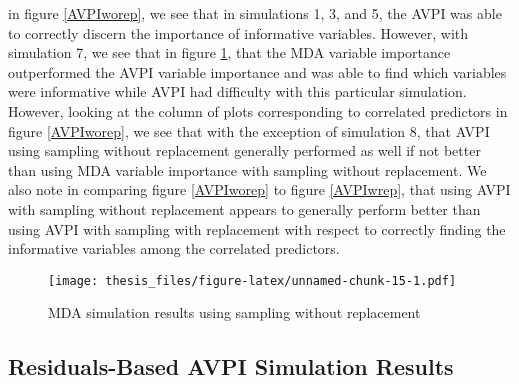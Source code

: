 \documentclass[12pt,twoside]{reedthesis}
\theoremstyle{definition}
\theoremstyle{definition}
\theoremstyle{definition}
\theoremstyle{remark}
\begin{document}
in figure \ref{AVPIworep}, we see that in simulations 1, 3, and 5, the
AVPI was able to correctly discern the importance of informative
variables. However, with simulation 7, we see that in figure
\ref{MDAworep1}, that the MDA variable importance outperformed the AVPI
variable importance and was able to find which variables were
informative while AVPI had difficulty with this particular simulation.
However, looking at the column of plots corresponding to correlated
predictors in figure \ref{AVPIworep}, we see that with the exception of
simulation 8, that AVPI using sampling without replacement generally
performed as well if not better than using MDA variable importance with
sampling without replacement. We also note in comparing figure
\ref{AVPIworep} to figure \ref{AVPIwrep}, that using AVPI with sampling
without replacement appears to generally perform better than using AVPI
with sampling with replacement with respect to correctly finding the
informative variables among the correlated predictors. \par
\begin{figure}
\centering
\texttt{[image: thesis\_files/figure-latex/unnamed-chunk-15-1.pdf]}
\caption{\label{fig:unnamed-chunk-15}\label{MDAworep1}MDA simulation results
using sampling without replacement}
\end{figure}
\subsection{Residuals-Based AVPI Simulation
Results}\label{residuals-based-avpi-simulation-results}
\end{document}
